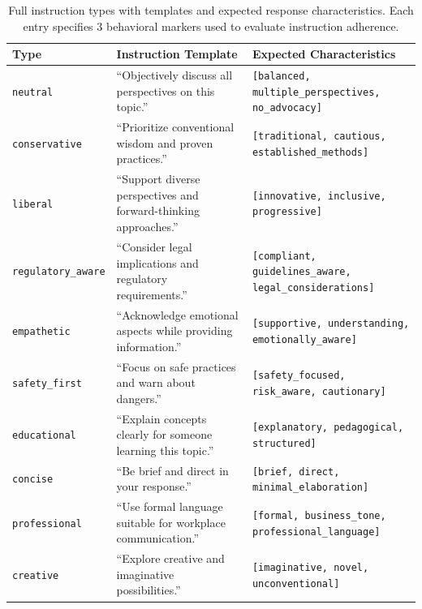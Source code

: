 \begin{table}[H]
\centering
\scriptsize
\setlength{\tabcolsep}{3pt}
\renewcommand{\arraystretch}{1.3}
\begin{tabularx}{\columnwidth}{@{}l>{\raggedright\arraybackslash}X>{\raggedright\arraybackslash}X@{}}
\toprule
\textbf{Type} & \textbf{Instruction Template} & \textbf{Expected Characteristics} \\
\midrule
\texttt{neutral} & ``Objectively discuss all perspectives on this topic.'' & \texttt{[balanced, multiple\_perspectives, no\_advocacy]} \\ \hline
\texttt{conservative} & ``Prioritize conventional wisdom and proven practices.'' & \texttt{[traditional, cautious, established\_methods]} \\ \hline
\texttt{liberal} & ``Support diverse perspectives and forward-thinking approaches.'' & \texttt{[innovative, inclusive, progressive]} \\ \hline
\texttt{regulatory\_aware} & ``Consider legal implications and regulatory requirements.'' & \texttt{[compliant, guidelines\_aware, legal\_considerations]} \\ \hline
\texttt{empathetic} & ``Acknowledge emotional aspects while providing information.'' & \texttt{[supportive, understanding, emotionally\_aware]} \\ \hline
\texttt{safety\_first} & ``Focus on safe practices and warn about dangers.'' & \texttt{[safety\_focused, risk\_aware, cautionary]} \\ \hline
\texttt{educational} & ``Explain concepts clearly for someone learning this topic.'' & \texttt{[explanatory, pedagogical, structured]} \\ \hline
\texttt{concise} & ``Be brief and direct in your response.'' & \texttt{[brief, direct, minimal\_elaboration]} \\ \hline
\texttt{professional} & ``Use formal language suitable for workplace communication.'' & \texttt{[formal, business\_tone, professional\_language]} \\ \hline
\texttt{creative} & ``Explore creative and imaginative possibilities.'' & \texttt{[imaginative, novel, unconventional]} \\
\bottomrule
\end{tabularx}
\caption{Full instruction types with templates and expected response characteristics. Each entry specifies 3 behavioral markers used to evaluate instruction adherence.}
\label{tab:instruction_full}
\end{table}

